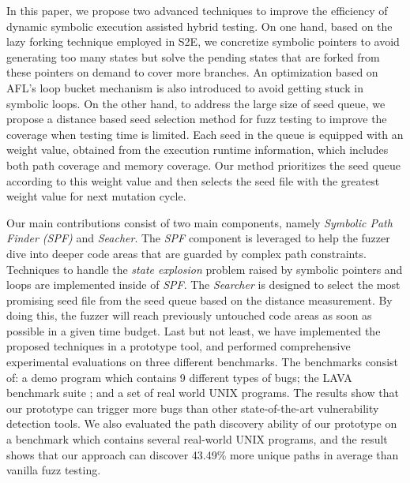 In this paper, we propose two advanced techniques to improve the
efficiency of dynamic symbolic execution assisted hybrid testing.  On
one hand, based on the lazy forking technique employed in
S2E\cite{chipounov2011s2e}, we concretize symbolic pointers to avoid
generating too many states but solve the pending states that are
forked from these pointers on demand to cover more branches. An
optimization based on AFL's \cite{online:afl} loop bucket mechanism is
also introduced to avoid getting stuck in symbolic loops. On the other
hand, to address the large size of seed queue, we propose a distance
based seed selection method for fuzz testing to improve the coverage
when testing time is limited. Each seed in the queue is equipped with
an weight value, obtained from the execution runtime information,
which includes both path coverage and memory coverage. Our method
prioritizes the seed queue according to this weight value and then
selects the seed file with the greatest weight value for next mutation
cycle.


Our main contributions consist of two main components, namely
\emph{Symbolic Path Finder (SPF)} and \emph{Seacher}. The \emph{SPF}
component is leveraged to help the fuzzer dive into deeper code areas
that are guarded by complex path constraints. Techniques to handle the
\textit{state explosion} problem raised by symbolic pointers and loops
are implemented inside of \emph{SPF}. The \emph{Searcher} is designed
to select the most promising seed file from the seed queue based on the
distance measurement. By doing this, the fuzzer will reach previously
untouched code areas as soon as possible in a given time budget.  Last
but not least,  we have implemented the proposed techniques in a
prototype tool, and performed comprehensive experimental evaluations on
three different benchmarks. The benchmarks consist of: a demo program
which contains 9 different types of bugs; the LAVA benchmark suite
\cite{dolan2016lava}; and a set of real world UNIX programs. The
results show that our prototype can trigger more bugs than other
state-of-the-art vulnerability detection tools. We also evaluated the
path discovery ability of our prototype on a benchmark which contains
several real-world UNIX programs, and the result shows that our
approach can discover 43.49\% more unique paths in average than vanilla
fuzz testing.

